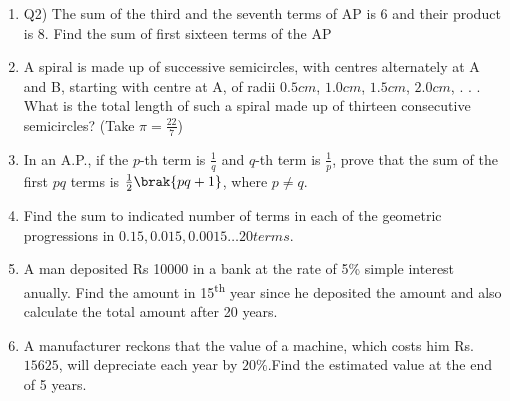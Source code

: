 \begin{enumerate}[label=\thechapter.\arabic*,ref=\thechapter.\theenumi]
\item Q2) The sum of the third and the seventh terms of AP is 6 and their product is 8. Find the sum of first sixteen terms of the AP \\
\solution
\pagebreak
\item A spiral is made up of successive semicircles, with centres alternately at A and B, starting with centre at A, of radii $0.5 cm$, $1.0 cm$, $1.5 cm$, $2.0 cm$, . . . What is the total length of such a spiral made up of thirteen consecutive semicircles? (Take $\pi = \frac{22}{7}$)\\
\solution
\newpage
\item In an A.P., if the $p$-th term is $\frac{1}{q}$ and $q$-th term is $\frac{1}{p}$, prove that the sum of the first $pq$ terms is $\frac{1}{2}\brak{pq + 1}$, where $p \neq q$.
\solution
\pagebreak

\item Find the sum to indicated number of terms in each of the geometric progressions in
$0.15, 0.015, 0.0015\ldots 20 terms$.\\
\solution

\pagebreak

\item A man deposited Rs 10000 in a bank at the rate of 5\% simple interest anually. Find the amount in 15\textsuperscript{th} year since he deposited the amount and also calculate the total amount after 20 years.\\
\solution

\pagebreak
\item A manufacturer reckons that the value of a machine, which costs him Rs.$15625$, will depreciate each year by $20\%$.Find the estimated value at the end of 5 years.\\
\solution
\pagebreak


\end{enumerate}
